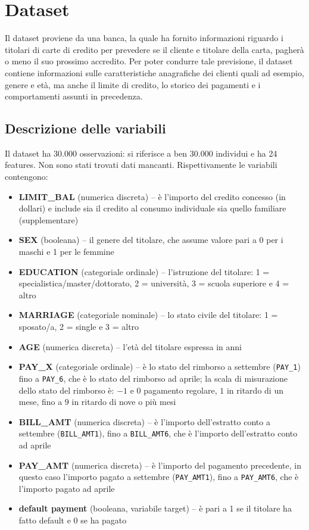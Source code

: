 \documentclass{article}
\begin{document}
\section{Dataset}

Il dataset proviene da una banca, la quale ha fornito informazioni riguardo i titolari di carte di credito per prevedere se il cliente e titolare della carta, pagher\`a o meno il suo prossimo accredito. Per poter condurre tale previsione, il dataset contiene informazioni sulle caratteristiche anagrafiche dei clienti quali ad esempio, genere e et\`a, ma anche il limite di credito, lo storico dei pagamenti e i comportamenti assunti in precedenza. 
\\
\subsection{Descrizione delle variabili}
Il dataset ha 30.000 osservazioni: si riferisce a ben 30.000 individui e ha 24 features. Non sono stati trovati dati mancanti.
Rispettivamente le variabili contengono:
\begin{itemize}
    \item \textbf{LIMIT\_BAL} (numerica discreta) -- \`e l'importo del credito concesso (in dollari) e include sia il credito al consumo individuale sia quello familiare (supplementare)
    \item \textbf{SEX} (booleana) -- il genere del titolare, che assume valore pari a 0 per i maschi e 1 per le femmine
    \item \textbf{EDUCATION} (categoriale ordinale) -- l'istruzione del titolare: 1 = specialistica/master/dottorato, 2 = universit\`a, 3 = scuola superiore e 4 = altro
    \item \textbf{MARRIAGE} (categoriale nominale) -- lo stato civile del titolare: 1 = sposato/a, 2 = single e 3 = altro
    \item \textbf{AGE} (numerica discreta) -- l'et\`a del titolare espressa in anni
    \item \textbf{PAY\_X} (categoriale ordinale) -- \`e lo stato del rimborso a settembre (\texttt{PAY\_1}) fino a \texttt{PAY\_6}, che \`e lo stato del rimborso ad aprile; la scala di misurazione dello stato del rimborso \`e: $-1$ e $0$ pagamento regolare, $1$ in ritardo di un mese, fino a $9$ in ritardo di nove o pi\`u mesi
    \item \textbf{BILL\_AMT} (numerica discreta) -- \`e l'importo dell'estratto conto a settembre (\texttt{BILL\_AMT1}), fino a \texttt{BILL\_AMT6}, che \`e l'importo dell'estratto conto ad aprile
    \item \textbf{PAY\_AMT} (numerica discreta) -- \`e l'importo del pagamento precedente, in questo caso l'importo pagato a settembre (\texttt{PAY\_AMT1}), fino a \texttt{PAY\_AMT6}, che \`e l'importo pagato ad aprile
    \item \textbf{default payment} (booleana, variabile target) -- \`e pari a 1 se il titolare ha fatto default e 0 se ha pagato
\end{itemize}
\end{document}
